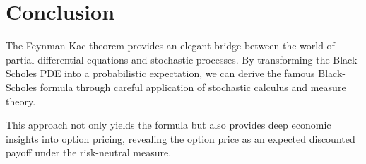 \documentclass[11pt,a4paper]{article}
\begin{document}
\section{Conclusion}

The Feynman-Kac theorem provides an elegant bridge between the world of partial differential equations and stochastic processes. By transforming the Black-Scholes PDE into a probabilistic expectation, we can derive the famous Black-Scholes formula through careful application of stochastic calculus and measure theory.

This approach not only yields the formula but also provides deep economic insights into option pricing, revealing the option price as an expected discounted payoff under the risk-neutral measure.
\end{document}

